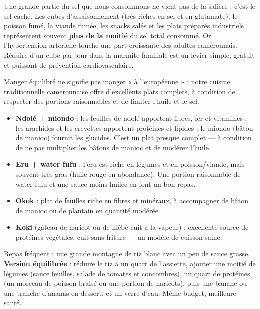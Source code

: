 \documentclass[11pt]{article}
\newcommand{\cle}[1]{{\popxbold\color{popdark}#1}}
\newcounter{popsec}
\newcounter{popsub}
\newcommand{\courssub}[1]{%
  \stepcounter{popsub}%
  \par\vspace{9pt}\noindent{\popxbold\fontsize{11.5}{13}\selectfont\color{popink}{\color{poporange}\thepopsec.\thepopsub}\hspace{6pt}#1}\par\nopagebreak\vspace{4pt}
}
\begin{document}
\begin{savaistu}
Une grande partie du sel que nous consommons ne vient pas de la salière : c'est le \cle{sel caché}. Les cubes d'assaisonnement (très riches en sel et en glutamate), le poisson fumé, la viande fumée, les snacks salés et les plats préparés industriels représentent souvent \textbf{plus de la moitié} du sel total consommé. Or l'hypertension artérielle touche une part croissante des adultes camerounais. Réduire d'un cube par jour dans la marmite familiale est un levier simple, gratuit et puissant de prévention cardiovasculaire.
\end{savaistu}

\courssub{Valoriser l'alimentation locale}

Manger équilibré ne signifie pas manger « à l'européenne » : notre cuisine traditionnelle camerounaise offre d'excellents plats complets, à condition de respecter des portions raisonnables et de limiter l'huile et le sel.

\begin{itemize}
\item \textbf{Ndolé + miondo} : les feuilles de ndolé apportent fibres, fer et vitamines ; les arachides et les crevettes apportent protéines et lipides ; le miondo (bâton de manioc) fournit les glucides. C'est un plat presque complet — à condition de ne pas multiplier les bâtons de manioc et de modérer l'huile.
\item \textbf{Eru + water fufu} : l'eru est riche en légumes et en poisson/viande, mais souvent très gras (huile rouge en abondance). Une portion raisonnable de water fufu et une sauce moins huilée en font un bon repas.
\item \textbf{Okok} : plat de feuilles riche en fibres et minéraux, à accompagner de bâton de manioc ou de plantain en quantité modérée.
\item \textbf{Koki} (gâteau de haricot ou de niébé cuit à la vapeur) : excellente source de protéines végétales, cuit sans friture — un modèle de cuisson saine.
\end{itemize}

\begin{exemplebox}
Repas fréquent : une grande montagne de riz blanc avec un peu de sauce grasse. \textbf{Version équilibrée} : réduire le riz à un quart de l'assiette, ajouter une moitié de légumes (sauce feuilles, salade de tomates et concombres), un quart de protéines (un morceau de poisson braisé ou une portion de haricots), puis une banane ou une tranche d'ananas en dessert, et un verre d'eau. Même budget, meilleure santé.
\end{exemplebox}
\end{document}
